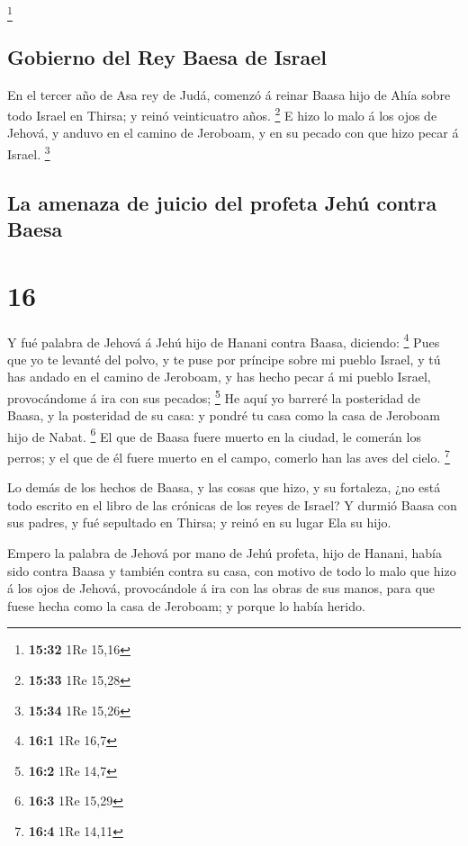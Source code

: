 \footnote{\textbf{15:32} 1Re 15,16}

\hypertarget{gobierno-del-rey-baesa-de-israel}{%
\subsection{Gobierno del Rey Baesa de
Israel}\label{gobierno-del-rey-baesa-de-israel}}

 En el tercer año de Asa rey de Judá, comenzó á reinar
Baasa hijo de Ahía sobre todo Israel en Thirsa; y reinó veinticuatro
años. \footnote{\textbf{15:33} 1Re 15,28}  E hizo lo malo
á los ojos de Jehová, y anduvo en el camino de Jeroboam, y en su pecado
con que hizo pecar á Israel. \footnote{\textbf{15:34} 1Re 15,26}

\hypertarget{la-amenaza-de-juicio-del-profeta-jehuxfa-contra-baesa}{%
\subsection{La amenaza de juicio del profeta Jehú contra
Baesa}\label{la-amenaza-de-juicio-del-profeta-jehuxfa-contra-baesa}}

\hypertarget{section-15}{%
\section{16}\label{section-15}}

 Y fué palabra de Jehová á Jehú hijo de Hanani contra
Baasa, diciendo: \footnote{\textbf{16:1} 1Re 16,7}  Pues
que yo te levanté del polvo, y te puse por príncipe sobre mi pueblo
Israel, y tú has andado en el camino de Jeroboam, y has hecho pecar á mi
pueblo Israel, provocándome á ira con sus pecados; \footnote{\textbf{16:2}
  1Re 14,7}  He aquí yo barreré la posteridad de Baasa, y
la posteridad de su casa: y pondré tu casa como la casa de Jeroboam hijo
de Nabat. \footnote{\textbf{16:3} 1Re 15,29}  El que de
Baasa fuere muerto en la ciudad, le comerán los perros; y el que de él
fuere muerto en el campo, comerlo han las aves del cielo. \footnote{\textbf{16:4}
  1Re 14,11}

 Lo demás de los hechos de Baasa, y las cosas que hizo, y
su fortaleza, ¿no está todo escrito en el libro de las crónicas de los
reyes de Israel?  Y durmió Baasa con sus padres, y fué
sepultado en Thirsa; y reinó en su lugar Ela su hijo.

 Empero la palabra de Jehová por mano de Jehú profeta,
hijo de Hanani, había sido contra Baasa y también contra su casa, con
motivo de todo lo malo que hizo á los ojos de Jehová, provocándole á ira
con las obras de sus manos, para que fuese hecha como la casa de
Jeroboam; y porque lo había herido.

